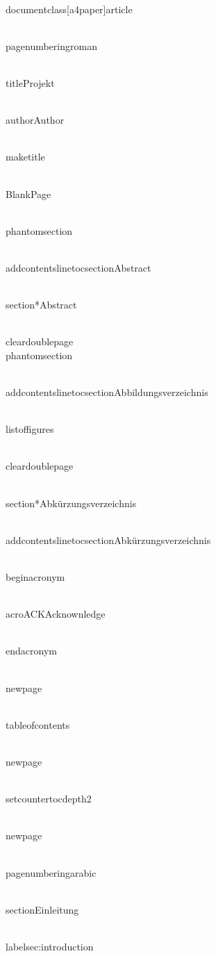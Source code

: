 \\documentclass[a4paper]{article}
\begin{document}
\\pagenumbering{roman}

\\title{Projekt}

\\author{Author}

\\maketitle

\\BlankPage

\\phantomsection

\\addcontentsline{toc}{section}{Abstract}

\\section*{Abstract}

\\cleardoublepage
\\phantomsection

\\addcontentsline{toc}{section}{Abbildungsverzeichnis}

\\listoffigures

\\cleardoublepage

\\section*{Abkürzungsverzeichnis}

\\addcontentsline{toc}{section}{Abkürzungsverzeichnis}

\\begin{acronym}

    \\acro{ACK}{Acknownledge}

\\end{acronym}

\\newpage

\\tableofcontents


\\newpage

\\setcounter{tocdepth}{2}


\\newpage

\\pagenumbering{arabic}

\\section{Einleitung}

\\label{sec:introduction}
\end{document}
